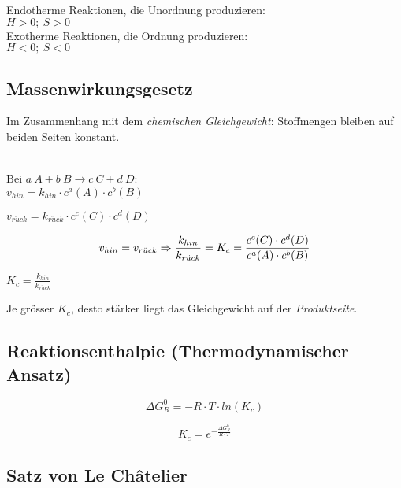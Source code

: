 Endotherme Reaktionen, die Unordnung produzieren: \\ $H>0;\ S>0$
\\

Exotherme Reaktionen, die Ordnung produzieren: \\ $H<0;\ S<0$

\subsection{Massenwirkungsgesetz}
\label{mwg}

Im Zusammenhang mit dem \textit{chemischen Gleichgewicht}: Stoffmengen bleiben auf beiden Seiten konstant. \\ \\
{\large
	Bei $a \ A + b\ B \rightarrow c\ C + d\ D$: \\
	
	$v_{hin} = k_{hin} \cdot c^a(A) \cdot c^b(B)$
	
	$v_{r\ddot{u}ck} = k_{r\ddot{u}ck} \cdot c^c(C) \cdot c^d(D)$
	
	\begin{equation}
		v_{hin}=v_{r\ddot{u}ck} \\
		 \Rightarrow \frac{k_{hin}}{k_{r\ddot{u}ck}}=K_c=\frac{c^c(C) \cdot c^d(D)}{c^a(A) \cdot c^b(B)}
	\end{equation}
	
}

\begin{definition}[Gleichgewichtskonstante]
	{\large$K_c=\frac{k_{hin}}{k_{r\ddot{u}ck}}$}
	
	Je grösser $K_c$, desto stärker liegt das Gleichgewicht auf der \textit{Produktseite}.
\end{definition}

\subsection{Reaktionsenthalpie (Thermodynamischer Ansatz)}
{\large
\begin{equation}
	\Delta G^0_R = -R \cdot T \cdot ln(K_c)
\end{equation}

\begin{equation}
	K_c = e^{-\frac{\Delta G^0_R}{R \cdot T}}
\end{equation}

}

\subsection{Satz von Le Châtelier}

